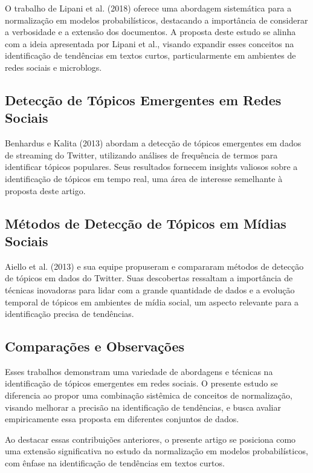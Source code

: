 \documentclass[12pt]{article}
\begin{document}
O trabalho de Lipani et al. (2018) \cite{Lipani2018} oferece uma abordagem sistemática para a normalização em modelos probabilísticos, destacando a importância de considerar a verbosidade e a extensão dos documentos. A proposta deste estudo se alinha com a ideia apresentada por Lipani et al., visando expandir esses conceitos na identificação de tendências em textos curtos, particularmente em ambientes de redes sociais e microblogs.

\subsection{Detecção de Tópicos Emergentes em Redes Sociais}

Benhardus e Kalita (2013) \cite{Benhardus2013} abordam a detecção de tópicos emergentes em dados de streaming do Twitter, utilizando análises de frequência de termos para identificar tópicos populares. Seus resultados fornecem insights valiosos sobre a identificação de tópicos em tempo real, uma área de interesse semelhante à proposta deste artigo.

\subsection{Métodos de Detecção de Tópicos em Mídias Sociais}

Aiello et al. (2013) \cite{Aiello2013} e sua equipe propuseram e compararam métodos de detecção de tópicos em dados do Twitter. Suas descobertas ressaltam a importância de técnicas inovadoras para lidar com a grande quantidade de dados e a evolução temporal de tópicos em ambientes de mídia social, um aspecto relevante para a identificação precisa de tendências.

\subsection{Comparações e Observações}

Esses trabalhos demonstram uma variedade de abordagens e técnicas na identificação de tópicos emergentes em redes sociais. O presente estudo se diferencia ao propor uma combinação sistêmica de conceitos de normalização, visando melhorar a precisão na identificação de tendências, e busca avaliar empiricamente essa proposta em diferentes conjuntos de dados.

Ao destacar essas contribuições anteriores, o presente artigo se posiciona como uma extensão significativa no estudo da normalização em modelos probabilísticos, com ênfase na identificação de tendências em textos curtos.
\end{document}
